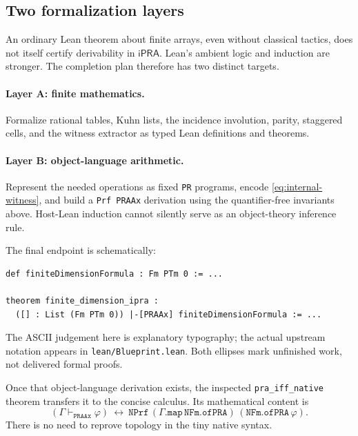 \documentclass[11pt,a4paper]{article}
\theoremstyle{definition}
\newcommand{\ipra}{\mathsf{iPRA}}
\begin{document}
\subsection{Two formalization layers}
An ordinary Lean theorem about finite arrays, even without
classical tactics, does not itself certify derivability
in $\ipra$. Lean's ambient logic and induction are stronger.
The completion plan therefore has two distinct targets.

\paragraph{Layer A: finite mathematics.}
Formalize rational tables, Kuhn lists, the incidence
involution, parity, staggered cells, and the witness
extractor as typed Lean definitions and theorems.

\paragraph{Layer B: object-language arithmetic.}
Represent the needed operations as fixed \texttt{PR}
programs, encode \eqref{eq:internal-witness}, and build
a \texttt{Prf PRAAx} derivation using the quantifier-free
invariants above. Host-Lean induction cannot silently
serve as an object-theory inference rule.

The final endpoint is schematically:
\begin{lstlisting}
def finiteDimensionFormula : Fm PTm 0 := ...

theorem finite_dimension_ipra :
  ([] : List (Fm PTm 0)) |-[PRAAx] finiteDimensionFormula := ...
\end{lstlisting}
The ASCII judgement here is explanatory typography; the
actual upstream notation appears in
\texttt{lean/Blueprint.lean}. Both ellipses mark unfinished
work, not delivered formal proofs.

Once that object-language derivation exists, the inspected
\texttt{pra\_iff\_native} theorem transfers it to the concise
calculus. Its mathematical content is
\[
 (\Gamma\vdash_{\texttt{PRAAx}}\varphi)
 \ \longleftrightarrow\
 \texttt{NPrf}\,
 (\Gamma.\texttt{map}\,\texttt{NFm.ofPRA})\,
 (\texttt{NFm.ofPRA}\,\varphi).
\]
There is no need to reprove topology in the tiny native
syntax.
\end{document}
